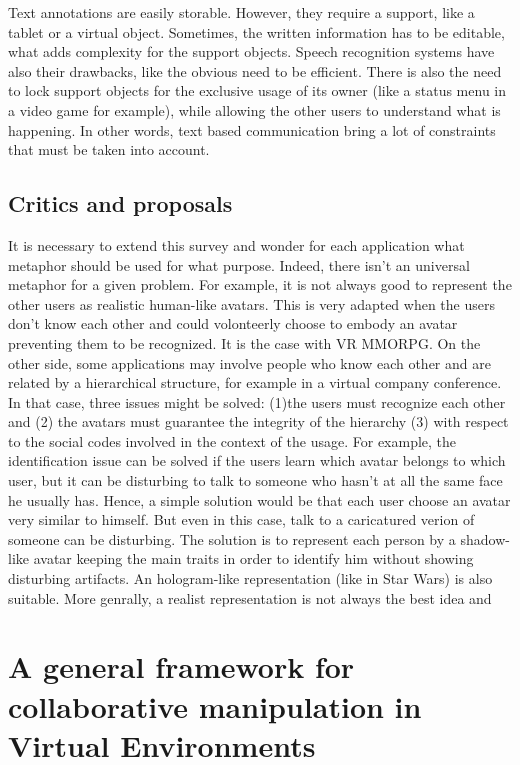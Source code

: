 \documentclass[a4paper]{article}
\begin{document}
Text annotations are easily storable. However, they require a support, like a tablet or a virtual object. Sometimes, the written information has to be editable, what adds complexity for the support objects. Speech recognition systems have also their drawbacks, like the obvious need to be efficient. There is also the need to lock support objects for the exclusive usage of its owner (like a status menu in a video game for example), while allowing the other users to understand what is happening. In other words, text based communication bring a lot of constraints that must be taken into account.

\subsection{Critics and proposals}
It is necessary to extend this survey and wonder for each application what metaphor should be used for what purpose. Indeed, there isn't an universal metaphor for a given problem. For example, it is not always good to represent the other users as realistic human-like avatars. This is very adapted when the users don't know each other and could volonteerly choose to embody an avatar preventing them to be recognized. It is the case with VR MMORPG. On the other side, some applications may involve people who know each other and are related by a hierarchical structure, for example in a virtual company conference. In that case, three issues might be solved: (1)the users must recognize each other and (2) the avatars must guarantee the integrity of the hierarchy (3) with respect to the social codes involved in the context of the usage. For example, the identification issue can be solved if the users learn which avatar belongs to which user, but it can be disturbing to talk to someone who hasn't at all the same face he usually has. Hence, a simple solution would be that each user choose an avatar very similar to himself. But even in this case, talk to a caricatured verion of someone can be disturbing. The solution is to represent each person by a shadow-like avatar keeping the main traits in order to identify him without showing disturbing artifacts. An hologram-like representation (like in Star Wars) is also suitable.
More genrally, a realist representation is not always the best idea and 

\section{A general framework for collaborative manipulation in Virtual Environments}
\end{document}

